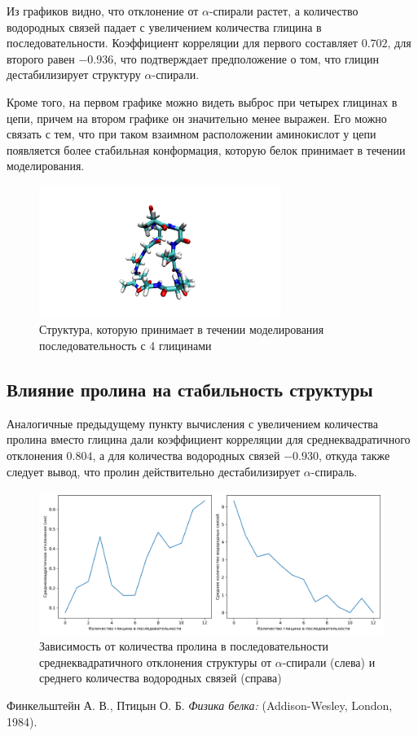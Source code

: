 \documentclass[
11pt,%
tightenlines,%
twoside,%
onecolumn,%
nofloats,%
nobibnotes,%
nofootinbib,%
superscriptaddress,%
noshowpacs,%
centertags]%
{revtex4}
\begin{document}
Из графиков видно, что отклонение от $\alpha$-спирали растет, 
а количество водородных связей падает с увеличением количества глицина в последовательности.
Коэффициент корреляции для первого составляет $0.702$, для второго равен $-0.936$, 
что подтверждает предположение о том, что глицин дестабилизирует структуру $\alpha$-спирали. \par

Кроме того, на первом графике можно видеть выброс при четырех глицинах в цепи, 
причем на втором графике он значительно менее выражен. 
Его можно связать с тем, что при таком взаимном расположении аминокислот у цепи появляется более стабильная конформация, которую белок принимает в течении моделирования.

\begin{figure}[h]
	\centering
	\includegraphics[width=0.7\textwidth]{gly4}
	\caption{Структура, которую принимает в течении моделирования последовательность с 4 глицинами}
\end{figure}

\subsection{Влияние пролина на стабильность структуры}
Аналогичные предыдущему пункту вычисления с увеличением количества пролина вместо глицина 
дали коэффициент корреляции для среднеквадратичного отклонения $0.804$, 
а для количества водородных связей $-0.930$, откуда также следует вывод, 
что пролин действительно дестабилизирует $\alpha$-спираль.

\begin{figure}[h]
	\centering
	\includegraphics[width=\textwidth]{pro}
	\caption{Зависимость от количества пролина в последовательности среднеквадратичного отклонения структуры от $\alpha$-спирали (слева) и среднего количества водородных связей (справа)}
\end{figure}


%
%

\begin{thebibliography}{99}
Финкельштейн А. В., Птицын О. Б. \emph{Физика белка:} (Addison-Wesley, London, 1984).




\end{thebibliography}
\end{document}
